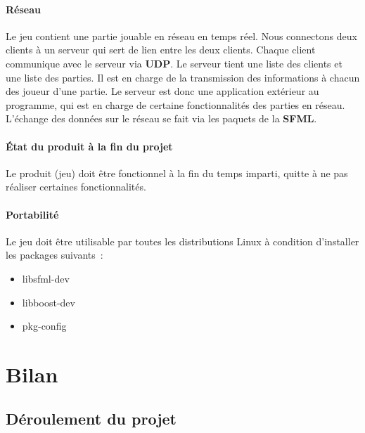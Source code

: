 \documentclass[french, 11pt]{report}
\begin{document}
			\subsubsection{Réseau}
				Le jeu contient une partie jouable en réseau en temps réel. Nous connectons deux clients à un serveur qui sert de lien entre les deux clients. Chaque client communique avec le serveur via \textbf{UDP}. 
				Le serveur tient une liste des clients et une liste des parties. 
				Il est en charge de la transmission des informations à chacun des joueur d'une partie. Le serveur est donc une application extérieur au programme, qui est en charge de certaine fonctionnalités des parties en réseau. L'échange des données sur le réseau se fait via les paquets de la \textbf{SFML}.
						
			\subsubsection{État du produit à la fin du projet}
				Le produit (jeu) doit être fonctionnel à la fin du temps imparti, quitte à ne pas réaliser certaines fonctionnalités.
			\subsubsection{Portabilité}
				Le jeu doit être utilisable par toutes les distributions Linux à condition d'installer les packages suivants~:
				\begin{itemize}
					\item libsfml-dev
					\item libboost-dev
					\item pkg-config
				\end{itemize}
	\chapter{Bilan}
		\section{Déroulement du projet}
\end{document}
